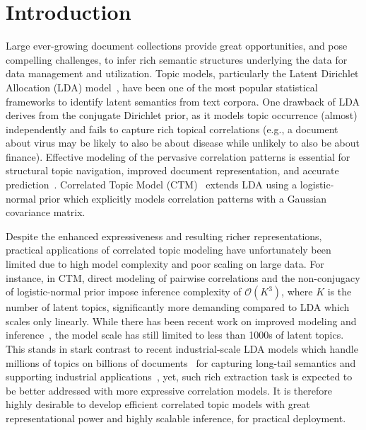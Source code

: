\documentclass[sigconf]{acmart}
\begin{document}
\section{Introduction}
Large ever-growing document collections provide great opportunities, and pose compelling challenges, to infer rich semantic structures underlying the data for data management and utilization.
Topic models, particularly the Latent Dirichlet Allocation (LDA) model~\cite{blei2003latent}, have been one of the most popular statistical frameworks to identify latent semantics from text corpora. One drawback of LDA derives from the conjugate Dirichlet prior, as it models topic occurrence (almost) independently and fails to capture rich topical correlations (e.g., a document about virus may be likely to also be about disease while unlikely to also be about finance). Effective modeling of the pervasive correlation patterns is essential for structural topic navigation, improved document representation, and accurate prediction~\cite{ranganath2016correlated,blei2007correlated,chen2013scalable}. Correlated Topic Model (CTM)~\cite{blei2007correlated} extends LDA using a logistic-normal prior which explicitly models correlation patterns with a Gaussian covariance matrix.

Despite the enhanced expressiveness and resulting richer representations, practical applications of correlated topic modeling have unfortunately been limited due to high model complexity and poor scaling on large data. For instance, in CTM, direct modeling of pairwise correlations and the non-conjugacy of logistic-normal prior impose inference complexity of $\mathcal{O}(K^3)$, where $K$ is the number of latent topics, significantly more demanding compared to LDA which scales only linearly. While there has been recent work on improved modeling and inference~\cite{chen2013scalable,paisley2012discrete,putthividhya2009independent,ahmed2007tight}, the model scale has still limited to less than 1000s of latent topics. This stands in stark contrast to recent industrial-scale LDA models which handle millions of topics on billions of documents~\cite{chen2016warplda,yuan2015lightlda} for capturing long-tail semantics and supporting industrial applications~\cite{wang2015peacock},  yet, such rich extraction task is expected to be better addressed with more expressive correlation models. It is therefore highly desirable to develop efficient correlated topic models with great representational power and highly scalable inference, for practical deployment.
\end{document}
